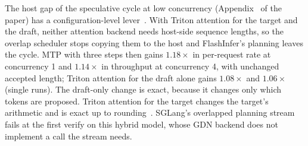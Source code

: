 The host gap of the speculative cycle at low concurrency (Appendix~ of the paper) has a configuration-level lever~. With Triton attention for the target and the draft, neither attention backend needs host-side sequence lengths, so the overlap scheduler stops copying them to the host and FlashInfer's planning leaves the cycle. MTP with three steps then gains $1.18\times$ in per-request rate at concurrency 1 and $1.14\times$ in throughput at concurrency 4, with unchanged accepted length; Triton attention for the draft alone gains $1.08\times$ and $1.06\times$ (single runs). The draft-only change is exact, because it changes only which tokens are proposed. Triton attention for the target changes the target's arithmetic and is exact up to rounding~. SGLang's overlapped planning stream fails at the first verify on this hybrid model, whose GDN backend does not implement a call the stream needs.

